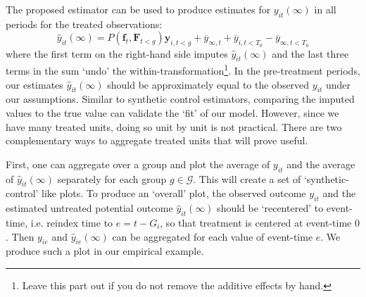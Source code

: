 \documentclass[12pt]{article}
\begin{document}
\begin{remark}\label{sec:plotting_estimates}

The proposed estimator can be used to produce estimates for $y_{it}(\infty)$ in all periods for the treated observations:
\begin{equation}
  \hat{y}_{it}(\infty) = P(\bm f_t, \bm F_{t < g}) \bm y_{i, t<g} + \overline{y}_{\infty, t} + \overline{y}_{i, t<T_0} - \overline{y}_{\infty, t<T_0}
\end{equation}
where the first term on the right-hand side imputes $\hat{y}_{it}(\infty)$ and the last three terms in the sum `undo' the within-transformation\footnote{Leave this part out if you do not remove the additive effects by hand.}. In the pre-treatment periods, our estimates $\hat{y}_{it}(\infty)$ should be approximately equal to the observed $y_{it}$ under our assumptions. Similar to synthetic control estimators, comparing the imputed values to the true value can validate the `fit' of our model. However, since we have many treated units, doing so unit by unit is not practical. There are two complementary ways to aggregate treated units that will prove useful. 

First, one can aggregate over a group and plot the average of $y_{it}$ and the average of $\hat{y}_{it}(\infty)$ separately for each group $g \in \mathcal{G}$. This will create a set of `synthetic-control' like plots. To produce an `overall' plot, the observed outcome $y_{it}$ and the estimated untreated potential outcome $\hat{y}_{it}(\infty)$ should be `recentered' to event-time, i.e. reindex time to $e = t - G_i$, so that treatment is centered at event-time $0$. Then $y_{ie}$ and $\hat{y}_{ie}(\infty)$ can be aggregated for each value of event-time $e$. We produce such a plot in our empirical example.

\end{remark}
\end{document}
